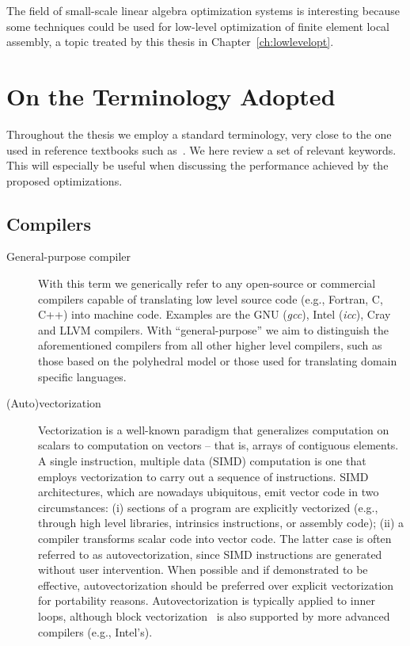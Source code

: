 The field of small-scale linear algebra optimization systems is interesting because some techniques could be used for low-level optimization of finite element local assembly, a topic treated by this thesis in Chapter~\ref{ch:lowlevelopt}.


\section{On the Terminology Adopted}
\label{sec:bkg:terminology}
Throughout the thesis we employ a standard terminology, very close to the one used in reference textbooks such as~\citep{patterson-book}. We here review a set of relevant keywords. This will especially be useful when discussing the performance achieved by the proposed optimizations.



\subsection*{Compilers}

\begin{description}
\item[General-purpose compiler] With this term we generically refer to any open-source or commercial compilers capable of translating low level source code (e.g., Fortran, C, C++) into machine code. Examples are the GNU ({\em gcc}), Intel ({\em icc}), Cray and LLVM compilers. With ``general-purpose'' we aim to distinguish the aforementioned compilers from all other higher level compilers, such as those based on the polyhedral model or those used for translating domain specific languages.

\item[(Auto)vectorization] Vectorization is a well-known paradigm that generalizes computation on scalars to computation on vectors -- that is, arrays of contiguous elements. A single instruction, multiple data (SIMD) computation is one that employs vectorization to carry out a sequence of instructions. SIMD architectures, which are nowadays ubiquitous, emit vector code in two circumstances: (i) sections of a program are explicitly vectorized (e.g., through high level libraries, intrinsics instructions, or assembly code); (ii) a compiler transforms scalar code into vector code. The latter case is often referred to as autovectorization, since SIMD instructions are generated without user intervention. When possible and if demonstrated to be effective, autovectorization should be preferred over explicit vectorization for portability reasons. Autovectorization is typically applied to inner loops, although block vectorization~\citep{SLP-vect} is also supported by more advanced compilers (e.g., Intel's). 

\end{description}


